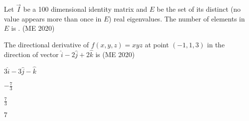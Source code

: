     \item Let $\vec{I}$ be a 100 dimensional identity matrix and ${E}$ be the set of its distinct (no value appears more than once in ${E}$) real eigenvalues. The number of elements in ${E}$ is \underline{\hspace{2cm}}.
	  \hfill (ME 2020)
    \item The directional derivative of $f(x, y, z) = xyz$ at point $(-1, 1, 3)$ in the direction of vector $\hat{i} - 2\hat{j} + 2\hat{k}$ is
	  \hfill (ME 2020)
          \begin{enumerate}
              \begin{multicols}{4}
                  \item $3\hat{i} - 3\hat{j} - \hat{k}$
                  \item $-\frac{7}{3}$
                  \item $\frac{7}{3}$
                  \item $7$
              \end{multicols}
          \end{enumerate}
